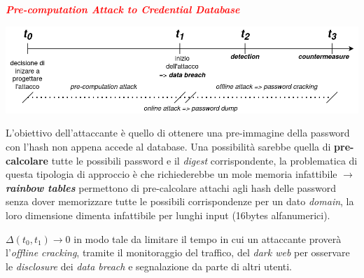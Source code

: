 \begin{boxA}
    \textcolor{red}{\textbf{\textit{Pre-computation Attack to Credential Database}}}

    \begin{center}
        \includegraphics[width=\textwidth]{img/pre_attack_pwd.png}
    \end{center}

    L'obiettivo dell'attaccante è quello di ottenere una pre-immagine della password con l'hash non appena accede al database. Una possibilità sarebbe quella di \textbf{pre-calcolare} tutte le possibili password e il \textit{digest} corrispondente, la problematica di questa tipologia di approccio è che richiederebbe un mole memoria infattibile $\rightarrow$ \textbf{\textit{rainbow tables}} permettono di pre-calcolare attachi agli hash delle password senza dover memorizzare tutte le possibili corrispondenze per un dato \textit{domain}, la loro dimensione dimenta infattibile per lunghi input (16bytes alfanumerici).

    \smallskip

    $\Delta(t_0, t_1) \rightarrow 0$ in modo tale da limitare il tempo in cui un attaccante proverà l'\textit{offline cracking}, tramite il monitoraggio del traffico, del \textit{dark web} per osservare le \textit{disclosure} dei \textit{data breach} e segnalazione da parte di altri utenti.
\end{boxA}

